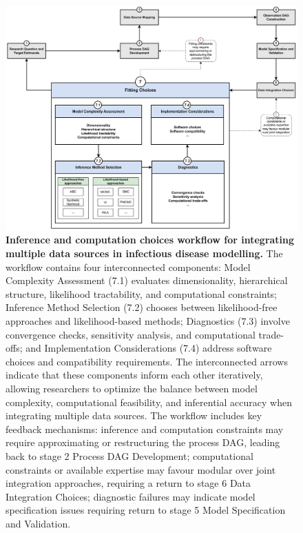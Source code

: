 \documentclass{article}
\begin{document}
\begin{figure}[htbp]
    \centering
    \includegraphics[width=\textwidth]{figures/subpanel_fitting choices.drawio.pdf}
    \caption{\textbf{Inference and computation choices workflow for integrating multiple data sources in infectious disease modelling.} The workflow contains four interconnected components: Model Complexity Assessment (7.1) evaluates dimensionality, hierarchical structure, likelihood tractability, and computational constraints; Inference Method Selection (7.2) chooses between likelihood-free approaches and likelihood-based methods; Diagnostics (7.3) involve convergence checks, sensitivity analysis, and computational trade-offs; and Implementation Considerations (7.4) address software choices and compatibility requirements. The interconnected arrows indicate that these components inform each other iteratively, allowing researchers to optimize the balance between model complexity, computational feasibility, and inferential accuracy when integrating multiple data sources. The workflow includes key feedback mechanisms: inference and computation constraints may require approximating or restructuring the process DAG, leading back to stage 2 Process DAG Development; computational constraints or available expertise may favour modular over joint integration approaches, requiring a return to stage 6 Data Integration Choices; diagnostic failures may indicate model specification issues requiring return to stage 5 Model Specification and Validation. }
    \label{fig:fitting}
\end{figure}


\end{document}
